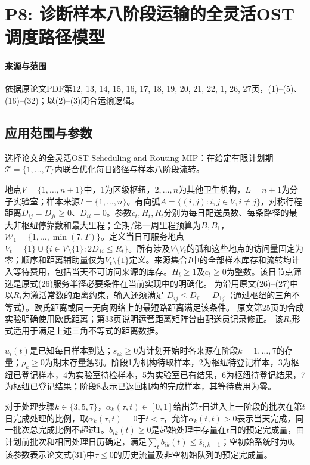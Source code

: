 \documentclass[UTF8,11pt]{ctexart}
\begin{document}
\section*{P8: 诊断样本八阶段运输的全灵活OST调度路径模型}
\paragraph{来源与范围}依据原论文PDF第12, 13, 14, 15, 16, 17, 18, 19, 20, 21, 22, 1, 26, 27页，(1)–(5)、(16)–(32)；以(2)–(3)闭合运输逻辑。
\subsection*{应用范围与参数}
选择论文的全灵活OST Scheduling and Routing MIP：在给定有限计划期$\mathcal T=\{1,\ldots,T\}$内联合优化每日路径与样本八阶段流转。

地点$V=\{1,\ldots,n+1\}$中，1为区级枢纽，$2,\ldots,n$为其他卫生机构，$L=n+1$为分子实验室；样本来源$I=\{1,\ldots,n\}$。有向弧$A=\{(i,j):i,j\in V,i\ne j\}$，对称行程距离$D_{ij}=D_{ji}\geq0$、$D_{ii}=0$。参数$c_t,H_t,R_t$分别为每日配送员数、每条路径的最大非枢纽停靠数和最大里程；全期/第一周里程预算为$B,B_1$，$\mathcal W_1=\{1,\ldots,\min(7,T)\}$。定义当日可服务地点$V_t=\{1\}\cup\{i\in V\setminus\{1\}:2D_{1i}\leq R_t\}$。所有涉及$V\setminus V_t$的弧和这些地点的访问量固定为零；顺序和距离辅助量仅为$V_t\setminus\{1\}$定义。来源集合$I$中的全部样本库存和流转均计入等待费用，包括当天不可访问来源的库存。$H_t\ge1$及$c_t\ge0$为整数。该日节点筛选是原式(26)服务半径必要条件在当前实现中的明确化。
为沿用原文(26)--(27)中以$R_t$为激活常数的距离约束，输入还须满足
$D_{ij}\leq D_{i1}+D_{1j}$（通过枢纽的三角不等式）。欧氏距离或同一无向网络上的最短路距离满足该条件。
原文第25页的合成实验明确使用欧氏距离；第33页说明运营距离矩阵曾由配送员记录修正。
该$R_t$形式适用于满足上述三角不等式的距离数据。


$u_i(t)$是已知每日样本到达；$\bar s_{ik}\geq0$为计划开始时各来源在阶段$k=1,\ldots,7$的存量；$\rho_k\geq0$为期末存量惩罚。阶段1为机构待取样本，2为枢纽待登记样本，3为枢纽已登记样本，4为实验室待检样本，5为实验室已有结果，6为枢纽待登记结果，7为枢纽已登记结果；阶段8表示已返回机构的完成样本，其等待费用为零。

对于处理步骤$k\in\{3,5,7\}$，$\alpha_k(\tau,t)\in[0,1]$给出第$\tau$日进入上一阶段的批次在第$t$日完成处理的比例，取$\alpha_k(\tau,t)=0$于$t<\tau$，允许$\alpha_k(t,t)>0$表示当天完成，同一批次总完成比例不超过1。$b_{ik}(t)\geq0$是起始处理中存量在$t$日的预定完成量，由计划前批次和相同处理日历确定，满足$\sum_t b_{ik}(t)\leq\bar s_{i,k-1}$；空初始系统时为0。该参数表示论文式(31)中$\tau\leq0$的历史流量及非空初始队列的预定完成量。
\end{document}

